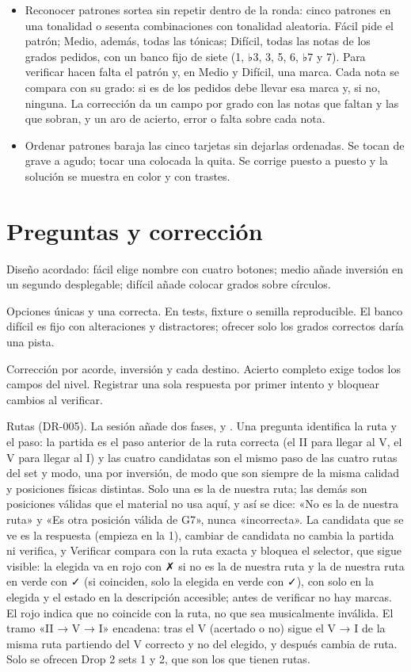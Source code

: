 \documentclass[a4paper,11pt]{article}
\let\originaltexttt\texttt
\renewcommand{\texttt}[1]{\originaltexttt{\seqsplit{#1}}}
\providecommand{\tightlist}{\setlength{\itemsep}{2pt}\setlength{\parskip}{0pt}}
\begin{document}
\begin{itemize}
\tightlist
\item
  Reconocer patrones sortea sin repetir dentro de la ronda: cinco
  patrones en una tonalidad o sesenta combinaciones con tonalidad
  aleatoria. Fácil pide el patrón; Medio, además, todas las tónicas;
  Difícil, todas las notas de los grados pedidos, con un banco fijo de
  siete (1, ♭3, 3, 5, 6, ♭7 y 7). Para verificar hacen falta el patrón
  y, en Medio y Difícil, una marca. Cada nota se compara con su grado:
  si es de los pedidos debe llevar esa marca y, si no, ninguna. La
  corrección da un campo por grado con las notas que faltan y las que
  sobran, y un aro de acierto, error o falta sobre cada nota.
\item
  Ordenar patrones baraja las cinco tarjetas sin dejarlas ordenadas. Se
  tocan de grave a agudo; tocar una colocada la quita. Se corrige puesto
  a puesto y la solución se muestra en color y con trastes.
\end{itemize}

\Needspace{4cm}
\section{Preguntas y corrección}\label{preguntas-y-correcciuxf3n}

Diseño acordado: fácil elige nombre con cuatro botones; medio añade
inversión en un segundo desplegable; difícil añade colocar grados sobre
círculos.

Opciones únicas y una correcta. En tests, fixture o semilla
reproducible. El banco difícil es fijo con alteraciones y distractores;
ofrecer solo los grados correctos daría una pista.

Corrección por acorde, inversión y cada destino. Acierto completo exige
todos los campos del nivel. Registrar una sola respuesta por primer
intento y bloquear cambios al verificar.

Rutas (DR-005). La sesión añade dos fases, \texttt{ruta} y
\texttt{ruta-verificada}. Una pregunta identifica la ruta y el paso: la
partida es el paso anterior de la ruta correcta (el II para llegar al V,
el V para llegar al I) y las cuatro candidatas son el mismo paso de las
cuatro rutas del set y modo, una por inversión, de modo que son siempre
de la misma calidad y posiciones físicas distintas. Solo una es la de
nuestra ruta; las demás son posiciones válidas que el material no usa
aquí, y así se dice: «No es la de nuestra ruta» y «Es otra posición
válida de G7», nunca «incorrecta». La candidata que se ve es la
respuesta (empieza en la 1), cambiar de candidata no cambia la partida
ni verifica, y Verificar compara con la ruta exacta y bloquea el
selector, que sigue visible: la elegida va en rojo con ✗ si no es la de
nuestra ruta y la de nuestra ruta en verde con ✓ (si coinciden, solo la
elegida en verde con ✓), con \texttt{aria-pressed} solo en la elegida y
el estado en la descripción accesible; antes de verificar no hay marcas.
El rojo indica que no coincide con la ruta, no que sea musicalmente
inválida. El tramo «II → V → I» encadena: tras el V (acertado o no)
sigue el V → I de la misma ruta partiendo del V correcto y no del
elegido, y después cambia de ruta. Solo se ofrecen Drop 2 sets 1 y 2,
que son los que tienen rutas.
\end{document}

